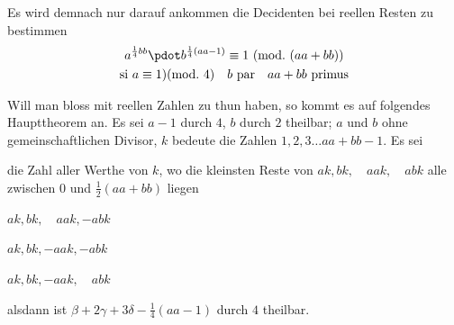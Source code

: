 Es wird demnach nur darauf ankommen die Decidenten bei reellen Resten zu bestimmen
\[
\begin{gathered}
a^{\frac14bb}\pdot b^{\frac14(aa-1)}\equiv1\ (\mathrm{mod.}\ (aa+bb))\\
\text{si }a\equiv1)(\mathrm{mod.}\ 4)\quad b\text{ par}\quad aa+bb\text{ primus}
\end{gathered}
\]

Will man bloss mit reellen Zahlen zu thun haben, so kommt es auf folgendes Haupttheorem an. Es sei $a-1$ durch $4$, $b$ durch $2$ theilbar; $a$ und $b$ ohne gemeinschaftlichen Divisor, $k$ bedeute die Zahlen $1,2,3\ldots aa+bb-1$.
Es sei
\begin{list}{}{\setlength{\labelwidth}{1.5em}\setlength{\leftmargin}{2em}}
\item[$\alpha$] die Zahl aller Werthe von $k$, wo die kleinsten Reste von $ak,\allowbreak bk,\quad\allowbreak aak,\quad\allowbreak abk$ alle zwischen $0$ und $\frac12(aa+bb)$ liegen
\item[$\beta$] $ak,bk,\quad aak,-abk$
\item[$\gamma$] $ak,bk,-aak,-abk$
\item[$\delta$] $ak,bk,-aak,\quad abk$
\end{list}
alsdann ist $\beta+2\gamma+3\delta-\frac14(aa-1)$ durch $4$ theilbar.
